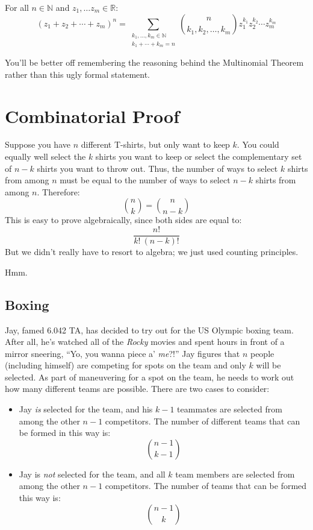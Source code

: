 \begin{theorem}\label{multinom-thm}
For all $n \in \mathbb{N}$ and $z_1, \dots z_m \in \mathbb{R}$:
\[
(z_1 + z_2 + \cdots + z_m)^n =
   \sum_{\substack{k_1, \dots, k_m \in \mathbb{N} \\
                   k_1 + \cdots + k_m = n}}
   \binom{n}{k_1, k_2, \dots, k_m} z_1^{k_1} z_2^{k_2} \cdots z_m^{k_m} 
\]
\end{theorem}
You'll be better off remembering the reasoning behind the Multinomial
Theorem rather than this ugly formal statement.


\section{Combinatorial Proof}\label{combinatorial_proof_sec}

Suppose you have $n$ different T-shirts, but only want to keep $k$.
You could equally well select the $k$ shirts you want to keep or
select the complementary set of $n - k$ shirts you want to throw out.
Thus, the number of ways to select $k$ shirts from among $n$ must be
equal to the number of ways to select $n - k$ shirts from among $n$.
Therefore:
%
\[
\binom{n}{k} = \binom{n}{n-k}
\]
%
This is easy to prove algebraically, since both sides are equal to:
%
\[
\frac{n!}{k!\ (n-k)!}
\]
%
But we didn't really have to resort to algebra; we just used counting
principles.

Hmm.

\subsection{Boxing}

Jay, famed 6.042 TA, has decided to try out for the US Olympic
boxing team.  After all, he's watched all of the \emph{Rocky} movies
and spent hours in front of a mirror sneering, ``Yo, you wanna piece
a' \emph{me}?!''  Jay figures that $n$ people (including himself)
are competing for spots on the team and only $k$ will be selected.  As
part of maneuvering for a spot on the team, he needs to work out how
many different teams are possible.  There are two cases to consider:

\begin{itemize}
  
\item Jay \emph{is} selected for the team, and his $k - 1$
  teammates are selected from among the other $n - 1$ competitors.
  The number of different teams that can be formed in this way is:
%
\[
\binom{n-1}{k-1}
\]

\item Jay is \emph{not} selected for the team, and all $k$ team
members are selected from among the other $n - 1$ competitors.  The
number of teams that can be formed this way is:
%
\[
\binom{n - 1}{k}
\]

\end{itemize}

